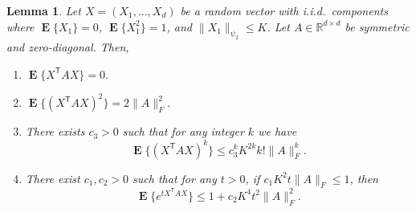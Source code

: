 \documentclass[letterpaper]{amsart}
\newcommand{\R}{\mathbb{R}}
\DeclareMathOperator{\E}{\mathbf{E}}
\numberwithin{thm}{section}
\newtheorem{lem}[thm]{Lemma}{\bfseries}{\itshape}
\newcommand{\lemlabel}[1]{\label{lem:#1}}
\theoremstyle{definition}
\theoremstyle{plain}
\newcommand{\transpose}{^{\mathsf{T}}}
\begin{document}
\begin{lem}\lemlabel{form-utils}
  Let $X = (X_1, \dots, X_d)$ be a random vector with i.i.d.\
  components where $\E\{X_1\} = 0$, $\E\{X_1^2\} = 1$, and $\|X_1\|_{\psi_2} \le
  K$. Let $A \in \R^{d \times d}$ be symmetric and zero-diagonal. Then,
  \begin{enumerate}[label=(\roman*)]
  \item \label{1-moment} $ \E\{X\transpose A X\} = 0 .$ 
  \item \label{2-moment} $\E\{(X\transpose A X)^2\} = 2 \|A\|_F^2 .$
  \item \label{k-moment} There exists $c_3>0$ such that for any integer $k$ we have 
    \[
      \E\{(X\transpose A X)^k\} \le c_3^k K^{2k} k! \|A\|_F^k .
    \]
  \item \label{exp-moment} There exist $c_1, c_2 > 0$ such that for any
    $t > 0$, if $c_1 K^2 t \|A\|_F\leq 1$, then
    \[
      \E\{e^{t X\transpose A X}\} \le 1 + c_2 K^4 t^2 \|A\|_F^2.
    \]
  \end{enumerate}
\end{lem}
\end{document}
